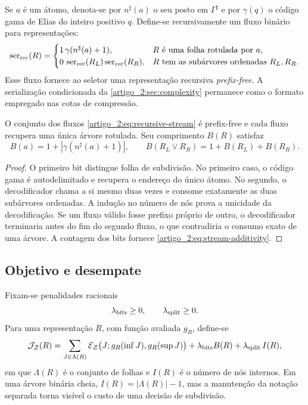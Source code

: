 Se $a$ é um átomo, denota-se por $n^\sharp(a)$ o seu posto em $\Gamma^\sharp$ e
por $\gamma(q)$ o código gama de Elias do inteiro positivo $q$. Define-se
recursivamente um fluxo binário para representações:
\begin{equation}
 \operatorname{ser}_{\rm rec}(R)=
 \begin{cases}
 1\,\gamma(n^\sharp(a)+1),&R\text{ é uma folha rotulada por }a,\\
 0\,\operatorname{ser}_{\rm rec}(R_L)\operatorname{ser}_{\rm rec}(R_R),
 &R\text{ tem as subárvores ordenadas }R_L,R_R.
 \end{cases}
 \label{artigo_2:eq:recursive-stream}
\end{equation}
Esse fluxo fornece ao seletor uma representação recursiva \emph{prefix-free}. A
serialização condicionada da \cref{artigo_2:sec:complexity} permanece como o formato
empregado nas cotas de compressão.

\begin{lemma}\label{map:artigo_2:5.1}
\label{artigo_2:lem:recursive-stream}
O conjunto dos fluxos \eqref{artigo_2:eq:recursive-stream} é prefix-free e cada fluxo
recupera uma única árvore rotulada. Seu comprimento $B(R)$ satisfaz
\begin{equation}
 B(a)=1+|\gamma(n^\sharp(a)+1)|,\qquad
 B(R_L\vee R_R)=1+B(R_L)+B(R_R).
 \label{artigo_2:eq:stream-additivity}
\end{equation}
\end{lemma}

\begin{proof}
O primeiro bit distingue folha de subdivisão. No primeiro caso, o código gama
é autodelimitado e recupera o endereço do único átomo. No segundo, o
decodificador chama a si mesmo duas vezes e consome exatamente as duas
subárvores ordenadas. A indução no número de nós prova a unicidade da
decodificação. Se um fluxo válido fosse prefixo próprio de outro, o
decodificador terminaria antes do fim do segundo fluxo, o que contradiria o
consumo exato de uma árvore. A contagem dos bits fornece
\eqref{artigo_2:eq:stream-additivity}.
\end{proof}

\subsection{Objetivo e desempate}

Fixam-se penalidades racionais
\[
 \lambda_{\rm bits}\ge0,\qquad \lambda_{\rm split}\ge0.
\]
Para uma representação $R$, com função avaliada $g_R$, define-se
\begin{equation}
 \mathcal{J}_{\mathcal Z}(R)
 =\sum_{J\in\Lambda(R)}
   \mathcal{E}_{\mathcal Z}\bigl(J;g_R(\inf J),g_R(\sup J)\bigr)
 +\lambda_{\rm bits}B(R)
 +\lambda_{\rm split}\,I(R),
 \label{artigo_2:eq:additive-objective}
\end{equation}
em que $\Lambda(R)$ é o conjunto de folhas e $I(R)$ é o número de nós internos.
Em uma árvore binária cheia, $I(R)=|\Lambda(R)|-1$, mas a manutenção da notação
separada torna visível o custo de uma decisão de subdivisão.

